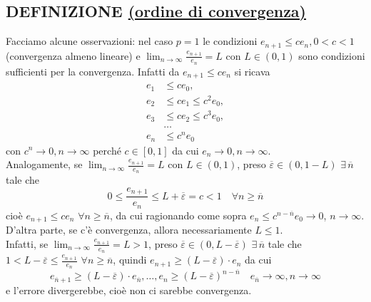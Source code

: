 \subsection{DEFINIZIONE \uline{(ordine di convergenza)}}
\begin{center}
\end{center}
Facciamo alcune osservazioni: nel caso $p=1$ le condizioni $e_{n+1} \leq ce_n, 0<c<1$  (convergenza almeno lineare) e $\lim_{n\to\infty}{\frac{e_{n+1}}{e_n}}=L$ con $L\in(0,1)$ sono condizioni sufficienti per la convergenza. Infatti da $e_{n+1}\leq ce_n$ si ricava 
\[\begin{split}
    e_1 & \leq ce_0, \\
    e_2 & \leq ce_1 \leq c^2e_0, \\
    e_3 & \leq ce_2 \leq c^3e_0, \\
    & \dotso \\
    e_n & \leq c^ne_0
\end{split}\] 
con $c^n\rightarrow 0,n\rightarrow\infty$ perché $c\in[0,1]$ da cui $e_n\rightarrow 0, n\rightarrow\infty$. \\
Analogamente, se $\lim_{n\to \infty}{\frac{e_{n+1}}{e_n}}=L$ con $L\in(0,1)$, preso $\overline{\varepsilon}\in(0,1-L)$ $\exists\, \overline{n}$ tale che 
\[0\leq\frac{e_{n+1}}{e_n}\leq L+\overline{\varepsilon}=c<1 \quad\forall n \geq \overline{n}\] 
cioè $e_{n+1}\leq ce_n$ $\forall n\geq\overline{n}$, da cui ragionando come sopra $e_n \leq c^{n-\overline{n}}e_0 \rightarrow 0$, $n\rightarrow\infty$.\\
D'altra parte, se c'è convergenza, allora necessariamente $L\le 1$.\\
Infatti, se $\lim_{n \to \infty} \frac{e_{n+1}}{e_n} = L > 1$, preso $\overline{\varepsilon} \in (0, L-\overline{\varepsilon})$ $ \exists\, \overline{n}$ tale che $1<L-\overline{\varepsilon} \leq \frac{e_{n+1}}{e_n}$ $\forall n \geq \overline{n}$, quindi $e_{n+1} \geq (L-\overline{\varepsilon})\cdot e_n$ da cui 
\[e_{\overline{n}+1} \geq (L-\overline{\varepsilon}) \cdot e_{\overline{n}}, \dotso, e_n \geq (L-\overline{\varepsilon})^{n-\overline{n}}\quad e_{\overline{n}} \to \infty, n \to \infty\]
e l'errore divergerebbe, cioè non ci sarebbe convergenza.

